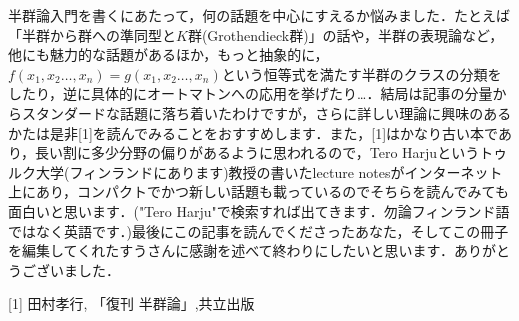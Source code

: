 半群論入門を書くにあたって，何の話題を中心にすえるか悩みました．たとえば「半群から群への準同型と$K$群(Grothendieck群)」の話や，半群の表現論など，他にも魅力的な話題があるほか，もっと抽象的に，$f(x_1,x_2\dots,x_n)=g(x_1,x_2\dots,x_n)$という恒等式を満たす半群のクラスの分類をしたり，逆に具体的にオートマトンへの応用を挙げたり…．結局は記事の分量からスタンダードな話題に落ち着いたわけですが，さらに詳しい理論に興味のあるかたは是非[1]を読んでみることをおすすめします．また，[1]はかなり古い本であり，長い割に多少分野の偏りがあるように思われるので，Tero Harjuというトゥルク大学(フィンランドにあります)教授の書いたlecture notesがインターネット上にあり，コンパクトでかつ新しい話題も載っているのでそちらを読んでみても面白いと思います．("Tero Harju"で検索すれば出てきます．勿論フィンランド語ではなく英語です．)最後にこの記事を読んでくださったあなた，そしてこの冊子を編集してくれたすうさんに感謝を述べて終わりにしたいと思います．ありがとうございました．
\begin{description}
	\item{[1]} 田村孝行, 「復刊 半群論」,共立出版
\end{description}
%